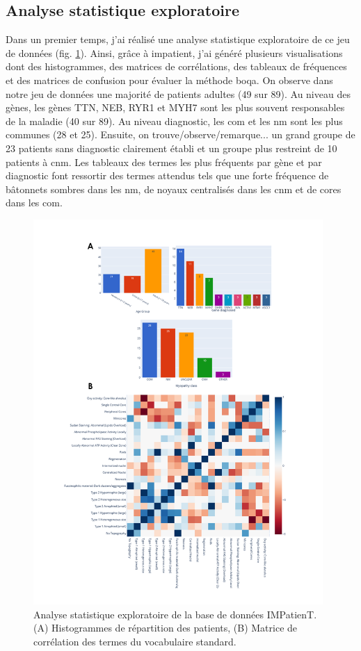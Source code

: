 \subsection{Analyse statistique exploratoire}
Dans un premier temps, j'ai réalisé une analyse statistique exploratoire de ce jeu de données (fig. \ref{fig:impatient_eda}). Ainsi, grâce à \gls{impatient}, j'ai généré plusieurs visualisations dont des histogrammes, des matrices de corrélations, des tableaux de fréquences et des matrices de confusion pour évaluer la méthode \gls{boqa}.  On observe dans notre jeu de données une majorité de patients adultes (49 sur 89). Au niveau des gènes, les gènes TTN, NEB, RYR1 et MYH7 sont les plus souvent responsables de la maladie (40 sur 89). Au niveau diagnostic, les \gls{com} et les \gls{nm} sont les plus communes (28 et 25). Ensuite, on trouve/observe/remarque... un grand groupe de 23 patients sans diagnostic clairement établi et un groupe plus restreint de 10 patients à \gls{cnm}. Les tableaux des termes les plus fréquents par gène et par diagnostic font ressortir des termes attendus tels que une forte fréquence de bâtonnets sombres dans les \gls{nm}, de noyaux centralisés dans les \gls{cnm} et de cores dans les \gls{com}.
\begin{figure}[!ht]
  \centering
  \includegraphics[width=0.98\textwidth]{figures/impatient_explo.png}
  \caption[Analyse statistique exploratoire IMPatienT]{Analyse statistique exploratoire de la base de données IMPatienT. (A) Histogrammes de répartition des patients, (B) Matrice de corrélation des termes du vocabulaire standard.}
  \label{fig:impatient_eda}
\end{figure}
